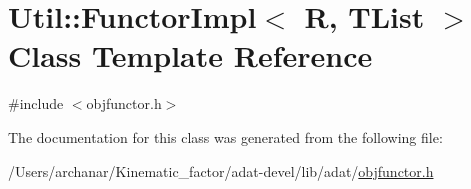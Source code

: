 \hypertarget{classUtil_1_1FunctorImpl}{}\section{Util\+:\+:Functor\+Impl$<$ R, T\+List $>$ Class Template Reference}
\label{classUtil_1_1FunctorImpl}


{\ttfamily \#include $<$objfunctor.\+h$>$}



The documentation for this class was generated from the following file\+:\begin{DoxyCompactItemize}
\item 
/\+Users/archanar/\+Kinematic\+\_\+factor/adat-\/devel/lib/adat/\mbox{\hyperlink{adat-devel_2lib_2adat_2objfunctor_8h}{objfunctor.\+h}}\end{DoxyCompactItemize}
